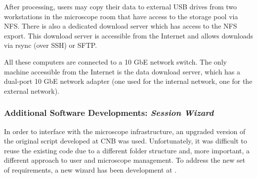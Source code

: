 


After processing, users may  copy their data to external USB drives from two workstations in the microscope room that have access to the storage pool via NFS.
There is also a dedicated download server which has access to the NFS export. This download server is accessible from  the Internet and allows downloads via rsync (over SSH) or SFTP. 

All these computers are connected to a 10 GbE network switch. The only machine accessible from the Internet is the data download server, which has a dual-port 10 GbE network adapter (one used for the internal network, one for the external network). %

\subsubsection{Additional Software Developments: \emph{Session Wizard}}
In order to interface \scipion with the microscope infrastructure, an upgraded version of the original script developed at CNB was used. Unfortunately, it was difficult to reuse the existing code due to a different folder structure and, more important, a different approach to user and microscope management. To address the new set of requirements, a new wizard has been development at \scilifelab. %

